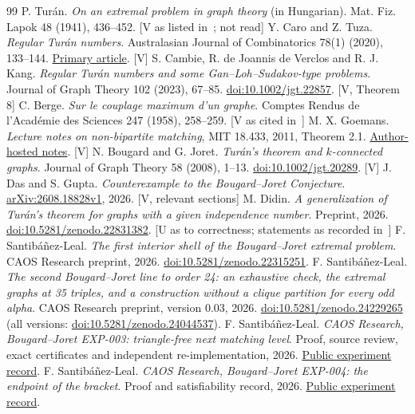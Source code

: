 \documentclass[11pt]{article}
\theoremstyle{remark}
\begin{document}
\begin{thebibliography}{99}
 P. Tur\'an.
\emph{On an extremal problem in graph theory} (in Hungarian).
Mat. Fiz. Lapok 48 (1941), 436--452. [V as listed in~\cite{AEY}; not read]
 Y. Caro and Z. Tuza.
\emph{Regular Tur\'an numbers}.
Australasian Journal of Combinatorics 78(1) (2020), 133--144.
\href{https://ajc.maths.uq.edu.au/pdf/78/ajc_v78_p133.pdf}{Primary article}. [V]
 S. Cambie, R. de Joannis de Verclos and R. J. Kang.
\emph{Regular Tur\'an numbers and some Gan--Loh--Sudakov-type problems}.
Journal of Graph Theory 102 (2023), 67--85.
\href{https://doi.org/10.1002/jgt.22857}{doi:10.1002/jgt.22857}. [V, Theorem 8]
 C. Berge.
\emph{Sur le couplage maximum d'un graphe}.
Comptes Rendus de l'Acad\'emie des Sciences 247 (1958), 258--259. [V as cited in~\cite{Goemans}]
 M. X. Goemans.
\emph{Lecture notes on non-bipartite matching}, MIT 18.433, 2011, Theorem 2.1.
\href{https://math.mit.edu/~goemans/18433S11/matching-nonbip-notes.pdf}{Author-hosted notes}. [V]
 N. Bougard and G. Joret.
\emph{Tur\'an's theorem and $k$-connected graphs}.
Journal of Graph Theory 58 (2008), 1--13.
\href{https://doi.org/10.1002/jgt.20289}{doi:10.1002/jgt.20289}. [V]
 J. Das and S. Gupta.
\emph{Counterexample to the Bougard--Joret Conjecture}.
\href{https://arxiv.org/abs/2608.18828}{arXiv:2608.18828v1}, 2026. [V, relevant sections]
 M. Didin.
\emph{A generalization of Tur\'an's theorem for graphs with a given independence number}.
Preprint, 2026.
\href{https://doi.org/10.5281/zenodo.22831382}{doi:10.5281/zenodo.22831382}. [U as to correctness; statements as recorded in~\cite{SR}]
 F. Santib\'a\~nez-Leal.
\emph{The first interior shell of the Bougard--Joret extremal problem}.
CAOS Research preprint, 2026.
\href{https://doi.org/10.5281/zenodo.22315251}{doi:10.5281/zenodo.22315251}.
 F. Santib\'a\~nez-Leal.
\emph{The second Bougard--Joret line to order 24: an exhaustive check, the extremal graphs at 35 triples, and a construction without a clique partition for every odd alpha}.
CAOS Research preprint, version 0.03, 2026.
\href{https://doi.org/10.5281/zenodo.24229265}{doi:10.5281/zenodo.24229265} (all versions: \href{https://doi.org/10.5281/zenodo.24044537}{doi:10.5281/zenodo.24044537}).
 F. Santib\'a\~nez-Leal.
\emph{CAOS Research, Bougard--Joret EXP-003: triangle-free next matching level}.
Proof, source review, exact certificates and independent re-implementation, 2026.
\href{https://github.com/fsantibanezleal/CAOS_RESEARCH/tree/main/problems/combinatorics/bougard-joret/experiments/EXP-003-triangle-free-next-matching}{Public experiment record}.
 F. Santib\'a\~nez-Leal.
\emph{CAOS Research, Bougard--Joret EXP-004: the endpoint of the bracket}.
Proof and satisfiability record, 2026.
\href{https://github.com/fsantibanezleal/CAOS_RESEARCH/tree/main/problems/combinatorics/bougard-joret/experiments/EXP-004-bracket-endpoint}{Public experiment record}.
\end{thebibliography}
\end{document}
